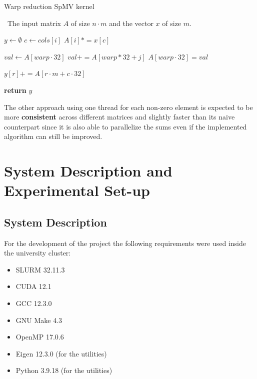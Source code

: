 \documentclass[conference]{IEEEtran}
\begin{document}
    \begin{algorithm}[!ht]
        \caption{Warp reduction SpMV kernel}
        \algorithmicrequire~The input matrix $A$ of size $n \cdot m$ and the vector $x$ of size $m$.
        \begin{algorithmic}[1]
                \State $y \gets \emptyset$
                    \State $c \gets cols[i]$
                    \State $A[i] *= x[c]$
                \EndFor

                    \State $val \gets A[warp \cdot 32]$
                            \State $val += A[warp * 32 + j]$
                        \EndFor
                    \EndFor
                    \State $A[warp \cdot 32] = val$
                \EndFor

                        \State $y[r] += A[r \cdot m + c \cdot 32]$
                    \EndFor
                \EndFor

                \State \textbf{return} $y$
            \EndProcedure
        \end{algorithmic}
        \label{alg:SpMVnz}
    \end{algorithm}

    The other approach using one thread for each non-zero element is expected
    to be more \textbf{consistent} across different matrices and slightly
    faster than its naive counterpart since it is also able to parallelize the
    sums even if the implemented algorithm can still be improved.

    \section{System Description and Experimental Set-up}
        \subsection{System Description}

        For the development of the project the following requirements were used
        inside the university cluster:
        \begin{itemize}
            \item SLURM 32.11.3
            \item CUDA 12.1
            \item GCC 12.3.0
            \item GNU Make 4.3
            \item OpenMP 17.0.6
            \item Eigen 12.3.0 (for the utilities)
            \item Python 3.9.18 (for the utilities) 
        \end{itemize}
\end{document}
